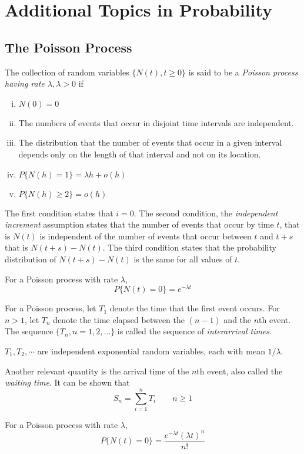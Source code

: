 \setcounter{chapter}{8}
\chapter{Additional Topics in Probability}
\section{The Poisson Process}
The collection of random variables $\{N(t), t\geq 0\}$ is said to be a \textit{Poisson process having rate $\lambda, \lambda > 0$} if 
\begin{enumerate}[i. ]
    \item $N(0) = 0$
    \item The numbers of events that occur in disjoint time intervals are independent.
    \item The distribution that the number of events that occur in a given interval depends only on the length of that interval and not on its location.
    \item $P\{N(h) = 1\} = \lambda h + o(h)$
    \item $P\{N(h)\geq 2\} = o(h)$
\end{enumerate}
The first condition states that $i = 0$. The second condition, the \textit{independent increment} assumption states that the number of events that occur by time $t$, that is $N(t)$ is independent of the number of events that occur between $t$ and $t + s$ that is $N(t + s) - N(t)$. The third condition states that the probability distribution of $N(t + s) - N(t)$ is the same for all values of $t$. 
\begin{lemma}
For a Poisson process with rate $\lambda$, \[P\{N(t) = 0\} = e^{-\lambda t}\]
\end{lemma}
For a Poisson process, let $T_1$ denote the time that the first event occurs. For $n > 1$, let $T_n$ denote the time elapsed between the $(n-1)$ and the $n$th event. The sequence $\{T_n, n = 1,2,\dots\}$ is called the sequence of \textit{interarrival times}. 
\begin{remark}
$T_1,T_2,\cdots $ are independent exponential random variables, each with mean $1/\lambda$. 
\end{remark}
Another relevant quantity is the arrival time of the $n$th event, also called the \textit{waiting time}. It can be shown that \[S_n = \sum^n_{i = 1}T_i\qquad n\geq 1\]
\begin{theorem}
    For a Poisson process with rate $\lambda$, \[P\{N(t) = 0\} = \frac{e^{-\lambda t}(\lambda t)^n}{n!}\]
\end{theorem}
